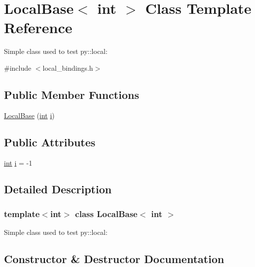 \hypertarget{class_local_base}{}\section{Local\+Base$<$ int $>$ Class Template Reference}
\label{class_local_base}


Simple class used to test py\+::local\+:  




{\ttfamily \#include $<$local\+\_\+bindings.\+h$>$}

\subsection*{Public Member Functions}
\begin{DoxyCompactItemize}
\item 
\mbox{\hyperlink{class_local_base_a51016c966a020fc0391fdd018307ff9f}{Local\+Base}} (\mbox{\hyperlink{warnings_8h_a74f207b5aa4ba51c3a2ad59b219a423b}{int}} \mbox{\hyperlink{class_local_base_ad318186ada2bcc20ad8e483cee7b52d3}{i}})
\end{DoxyCompactItemize}
\subsection*{Public Attributes}
\begin{DoxyCompactItemize}
\item 
\mbox{\hyperlink{warnings_8h_a74f207b5aa4ba51c3a2ad59b219a423b}{int}} \mbox{\hyperlink{class_local_base_ad318186ada2bcc20ad8e483cee7b52d3}{i}} = -\/1
\end{DoxyCompactItemize}


\subsection{Detailed Description}
\subsubsection*{template$<$int$>$\newline
class Local\+Base$<$ int $>$}

Simple class used to test py\+::local\+: 

\subsection{Constructor \& Destructor Documentation}
\mbox{\label{class_local_base_a51016c966a020fc0391fdd018307ff9f}} 
